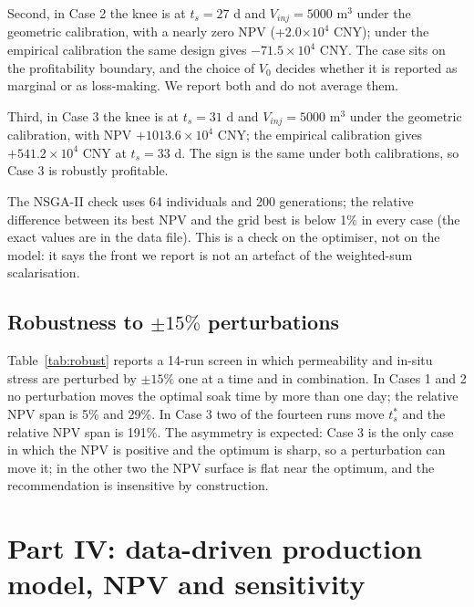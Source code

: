\documentclass{swmcmthesis}
\begin{document}
Second, in Case 2 the knee is at $t_s=27$ d and $V_{inj}=5000$ m$^3$ under the geometric calibration, with a nearly zero NPV (+2.0$\times10^4$ CNY); under the empirical calibration the same design gives $-71.5\times10^4$ CNY. The case sits on the profitability boundary, and the choice of $V_0$ decides whether it is reported as marginal or as loss-making. We report both and do not average them.

Third, in Case 3 the knee is at $t_s=31$ d and $V_{inj}=5000$ m$^3$ under the geometric calibration, with NPV $+1013.6\times10^4$ CNY; the empirical calibration gives $+541.2\times10^4$ CNY at $t_s=33$ d. The sign is the same under both calibrations, so Case 3 is robustly profitable.

The NSGA-II \cite{deb} check uses 64 individuals and 200 generations; the relative difference between its best NPV and the grid best is below 1\% in every case (the exact values are in the data file). This is a check on the optimiser, not on the model: it says the front we report is not an artefact of the weighted-sum scalarisation.

\subsection{Robustness to $\pm15\%$ perturbations}
Table~\ref{tab:robust} reports a 14-run screen in which permeability and in-situ stress are perturbed by $\pm15\%$ one at a time and in combination. In Cases 1 and 2 no perturbation moves the optimal soak time by more than one day; the relative NPV span is 5\% and 29\%. In Case 3 two of the fourteen runs move $t_s^\ast$ and the relative NPV span is 191\%. The asymmetry is expected: Case 3 is the only case in which the NPV is positive and the optimum is sharp, so a perturbation can move it; in the other two the NPV surface is flat near the optimum, and the recommendation is insensitive by construction.



\section{Part IV: data-driven production model, NPV and sensitivity}\label{sec:p4}
\end{document}

